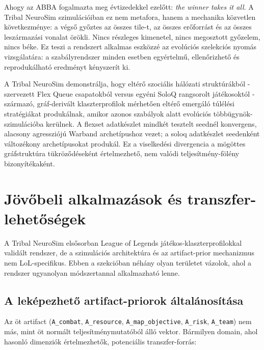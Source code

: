 ﻿\documentclass[a4paper,12pt]{report}
\begin{document}
Ahogy az ABBA fogalmazta meg évtizedekkel ezelőtt: \textit{the winner takes it all}.
A Tribal NeuroSim szimulációiban ez nem metafora, hanem a mechanika közvetlen
következménye: a végső győztes az összes tile-t, az összes erőforrást és az
összes leszármazási vonalat örökli. Nincs részleges kimenetel, nincs megosztott
győzelem, nincs béke. Ez teszi a rendszert alkalmas eszközzé az evolúciós szelekciós
nyomás vizsgálatára: a szabályrendszer minden esetben egyértelmű, ellenőrizhető
és reprodukálható eredményt kényszerít ki.

A Tribal NeuroSim demonstrálja, hogy eltérő szociális hálózati struktúrákból - szervezett Flex Queue csapatokból versus egyéni SoloQ rangsorolt játékosoktól - származó, gráf-derivált klaszterprofilok mérhetően eltérő emergáló túlélési stratégiákat produkálnak, amikor azonos szabályok alatt evolúciós többügynök-szimulációba kerülnek. A flexset adatkészlet mindkét tesztelt seednél konvergens, alacsony agressziójú Warband archetípushoz vezet; a soloq adatkészlet seedenként változékony archetípusokat produkál. Ez a viselkedési divergencia a mögöttes gráfstruktúra tükröződéseként értelmezhető, nem valódi teljesítmény-fölény bizonyítékaként.

\bigskip

\section{Jövőbeli alkalmazások és transzfer-lehetőségek}
\label{sec:neurosim-26-future}

A Tribal NeuroSim elsősorban League of Legends játékos-klaszterprofilokkal
validált rendszer, de a szimulációs architektúra és az artifact-prior mechanizmus
nem LoL-specifikus. Ebben a szekcióban néhány olyan területet vázolok, ahol
a rendszer ugyanolyan módszertannal alkalmazható lenne.

\subsection*{A leképezhető artifact-priorok általánosítása}

Az öt artifact (\texttt{A\_combat}, \texttt{A\_resource}, \texttt{A\_map\_objective},
\texttt{A\_risk}, \texttt{A\_team}) nem más, mint öt normált teljesítménymutatóból
álló vektor. Bármilyen domain, ahol hasonló dimenziók értelmezhetők, potenciális
transzfer-forrás:
\end{document}
